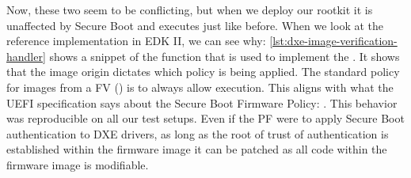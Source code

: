 Now, these two seem to be conflicting, but when we deploy our rootkit it is unaffected by Secure Boot and executes just like before.
When we look at the reference implementation in \ac{EDK} II, we can see why: \autoref{lst:dxe-image-verification-handler} shows a snippet of the function that is used to implement the .
It shows that the image origin dictates which policy is being applied.
The standard policy for images from a \acf{FV} () is to always allow execution.
This aligns with what the \ac{UEFI} specification says about the Secure Boot Firmware Policy:
.
This behavior was reproducible on all our test setups.
Even if the \ac{PF} were to apply Secure Boot authentication to \ac{DXE} drivers, as long as the root of trust of authentication is established within the firmware image it can be patched as all code within the firmware image is modifiable.

\vspace{1em}



\clearpage